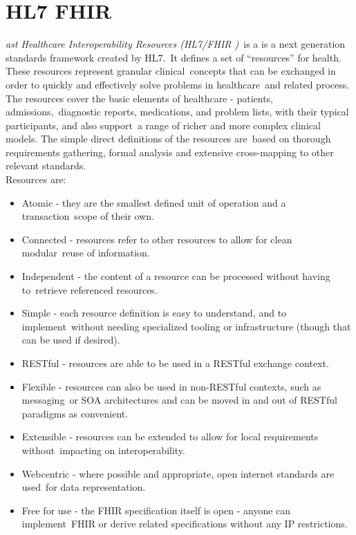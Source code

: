   \section[Fast Healthcare Interoperability Resources (HL7 FHIR\textsuperscript{\texttrademark})]
  {HL7 FHIR \textsuperscript{\texttrademark}}
    \label{sec:fhir}

  \textit{ast Healthcare Interoperability Resources (HL7/FHIR )}\
  is a is a next generation standards framework created by HL7.\
  It defines a set of ``resources'' for health. These resources represent granular clinical\
  concepts that can be exchanged in order to quickly and effectively solve problems in healthcare\
  and related process. The resources cover the basic elements of healthcare - patients, admissions,\
  diagnostic reports, medications, and problem lists, with their typical participants, and also support\
  a range of richer and more complex clinical models. The simple direct definitions of the resources are\
  based on thorough requirements gathering, formal analysis and extensive cross-mapping to other relevant standards. \citep{_fhir_intro_2013}\\

  Resources are:\

  \begin{itemize}
    \itemsep0ex
    \item Atomic - they are the smallest defined unit of operation and a transaction\
    scope of their own.\
    \item Connected - resources refer to other resources to allow for clean modular\
    reuse of information.\
    \item Independent - the content of a resource can be processed without having to\
    retrieve referenced resources.\
    \item Simple - each resource definition is easy to understand, and to implement\
    without needing specialized tooling or infrastructure (though that can be used if desired).\
    \item RESTful - resources are able to be used in a RESTful exchange context.\
    \item Flexible - resources can also be used in non-RESTful contexts, such as messaging\
    or SOA architectures and can be moved in and out of RESTful paradigms as convenient.\
    \item Extensible - resources can be extended to allow for local requirements without\
    impacting on interoperability.\
    \item Webcentric - where possible and appropriate, open internet standards are used\
    for data representation.\
    \item Free for use - the FHIR specification itself is open - anyone can implement\
    FHIR or derive related specifications without any IP restrictions.\
  \end{itemize}

